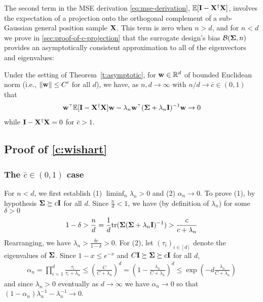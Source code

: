 \noindent

The second term in the MSE derivation \eqref{eq:mse-derivation}, $\mathbb E[\mathbf I -
\mathbf X^\dag \mathbf X]$, involves the expectation of a projection onto the orthogonal
complement of a sub-Gaussian general position sample $\mathbf X$.
This term is zero when $n > d$, and for $n < d$
we prove in \cref{sec:proof-of-c-projection} that the surrogate design's
bias $\mathcal{B}(\mathbf{\Sigma}, n)$ provides an asymptotically consistent approximation
to all of the eigenvectors and eigenvalues:

\begin{lemma}\label{c:projection}
Under the setting of Theorem~\ref{t:asymptotic}, for $\mathbf w \in \mathbb R^d$ of bounded Euclidean norm (i.e., $\| \mathbf w \| \le C'$ for all $d$), we have, as $n,d \to \infty$ with $n/d \to \bar c \in (0,1)$ that
\begin{align}
  \w^\top\E[\I-\X^\dagger\X]\w - \lambda_n \w^\top (\Sigmab + \lambda_n \I)^{-1}\w \to 0
  \label{eq:projection}
\end{align}
while $\mathbf I - \mathbf X^\dagger \mathbf X = 0$ for $\bar c > 1$.
\end{lemma}

\subsection{Proof of \cref{c:wishart}}
\label{sec:proof-of-c-wishart}

\subsubsection{The $\bar c \in (0,1)$ case}

For $n < d$, we first establish (1) $\liminf_n \lambda_n > 0$ and (2) $\alpha_n \to 0$.
To prove (1), by hypothesis $\mathbf{\Sigma} \succeq c \mathbf I$ for all $d$. Since $\frac{n}{d} < 1$,
we have (by definition of $\lambda_n$) for some $\delta > 0$
\begin{align*}
  1 - \delta
  > \frac{n}{d}
  = \frac{1}{d} \mathrm{tr}(\mathbf{\Sigma}(\mathbf{\Sigma} + \lambda_n \mathbf I)^{-1})
  > \frac{c}{c + \lambda_n}
\end{align*}
Rearranging, we have $\lambda_n > \frac{\delta c}{1 - \delta} > 0$.
For (2), let $(\tau_i)_{i \in [d]}$ denote the eigenvalues of $\mathbf{\Sigma}$.
Since $1 - x \leq e^{-x}$ and $C \mathbf I \succeq \mathbf{\Sigma} \succeq c \mathbf I$ for all $d$,
\begin{align*}
  \alpha_n
  = \prod_{i=1}^d \frac{\tau_i}{\tau_i + \lambda_n}
  \leq \left(\frac{C}{C + \lambda_n}\right)^d
  = \left( 1 - \frac{\lambda_n}{C + \lambda_n}\right)^d
  \leq \exp\left(-d \frac{\lambda_n}{C + \lambda_n}\right)
\end{align*}
and since $\lambda_n > 0$ eventually as $d \to \infty$ we have
$\alpha_n \to 0$ so that $(1-\alpha_n) \lambda_n^{-1} - \lambda_n^{-1} \to 0$.

